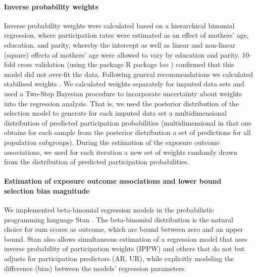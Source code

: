 \documentclass[12pt]{article}
\begin{document}
\paragraph{Inverse probability weights} 
Inverse probability weights were calculated based on a hierarchical binomial regression, where participation rates were estimated as an effect of mothers' age, education, and parity,  whereby the intercept as well as linear and non-linear (square) effects of mothers' age were allowed to vary by education and parity. 10-fold cross validation (using the package R package loo \cite{Vehtari2017-ne}) confirmed that this model did not over-fit the data. Following general recommendations we calculated stabilised weights \cite{Seaman2013-rj}. We calculated weights separately for imputed data sets and used a Two-Step Bayesian procedure \cite{Zigler2016-od} to incorporate uncertainty about weights into the regression analysis. That is, we used the posterior distribution of the selection model to generate for each imputed data set a multidimensional distribution of predicted participation probabilities (multidimensional in that one obtains for each sample from the posterior distribution a set of predictions for all population subgroups). During the estimation of the exposure outcome associations, we used for each iteration a new set of weights randomly drawn from the distribution of predicted participation probabilities.


\paragraph{Estimation of exposure outcome associations and lower bound selection bias magnitude} 
We implemented beta-binomial regression models in the probabilistic programming language Stan \cite{Carpenter2017-gd, Stan_Development_Team2017-lp}. The beta-binomial distribution is the natural choice for sum scores as outcome, which are bound between zero and an upper bound. Stan also allows simultaneous estimation of a regression model that uses inverse probability of participation weights (IPPW) and others that do not but adjusts for participation predictors (AR, UR), while explicitly modeling the difference (bias) between the models' regression parameters.
\end{document}
